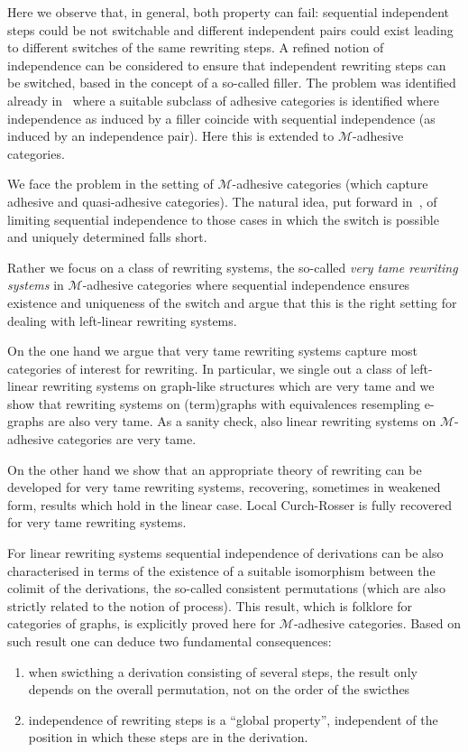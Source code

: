 \documentclass[a4paper,UKenglish,cleveref,pdftex, thm-restate,numberwithinsect]{lipics}
\begin{document}
Here we observe that, in general, both property can fail: sequential
independent steps could be not switchable and different independent
pairs could exist leading to different switches of the same rewriting
steps.  A refined notion of independence can be considered to ensure
that independent rewriting steps can be switched, based in the concept
of a so-called filler. The problem was identified already
in~\cite{baldan2011adhesivity} where a suitable subclass of adhesive
categories is identified where independence as induced by a filler
coincide with sequential independence (as induced by an independence
pair). Here this is extended to $\mathcal{M}$-adhesive categories.


We face the problem in the setting of $\mathcal{M}$-adhesive
categories (which capture adhesive and quasi-adhesive categories).
The natural idea, put forward in~\cite{baldan2017domains}, of limiting
sequential independence to those cases in which the switch is possible
and uniquely determined falls short.

Rather we focus on a class of rewriting systems, the so-called
\emph{very tame rewriting systems} in $\mathcal{M}$-adhesive
categories where sequential independence ensures existence and
uniqueness of the switch and argue that this is the right setting for
dealing with left-linear rewriting systems.

On the one hand we argue that very tame rewriting systems capture most
categories of interest for rewriting. In particular, we single out a
class of left-linear rewriting systems on graph-like structures which
are very tame and we show that rewriting systems on (term)graphs with
equivalences resempling e-graphs are also very tame. As a sanity
check, also linear rewriting systems on $\mathcal{M}$-adhesive
categories are very tame.

On the other hand we show that an appropriate theory of rewriting can
be developed for very tame rewriting systems, recovering, sometimes in
weakened form, results which hold in the linear case.  Local
Curch-Rosser is fully recovered for very tame rewriting systems.

For linear rewriting systems sequential independence of derivations
can be also characterised in terms of the existence of a suitable
isomorphism between the colimit of the derivations, the so-called
consistent permutations (which are also strictly related to the notion
of process). This result, which is folklore for categories of graphs,
is explicitly proved here for $\mathcal{M}$-adhesive categories. Based on such result one can deduce two fundamental consequences:
\begin{enumerate}
\item when swicthing a derivation consisting of several steps, the result only depends on the overall permutation, not on the order of the swicthes
\item independence of rewriting steps is a ``global property'', independent of the position in which these steps are in the derivation.
\end{enumerate}
\end{document}

